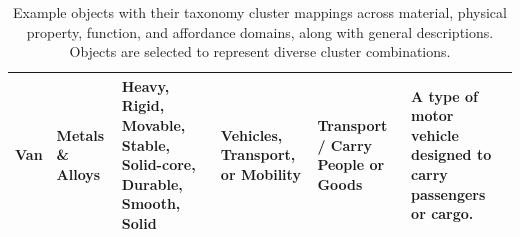\begin{table}[t]
\begin{tabular}{p{2cm}p{2.5cm}p{2.5cm}p{2.5cm}p{2.5cm}p{4cm}}
Van & Metals \& Alloys & Heavy, Rigid, Movable, Stable, Solid-core, Durable, Smooth, Solid & Vehicles, Transport, or Mobility & Transport / Carry People or Goods & A type of motor vehicle designed to carry passengers or cargo. \\
\bottomrule
\end{tabular}
\caption{Example objects with their taxonomy cluster mappings across material, physical property, function, and affordance domains, along with general descriptions. Objects are selected to represent diverse cluster combinations.}
\label{tab: object_taxonomy_mapping in the taxonomy clusters}
\end{table}
